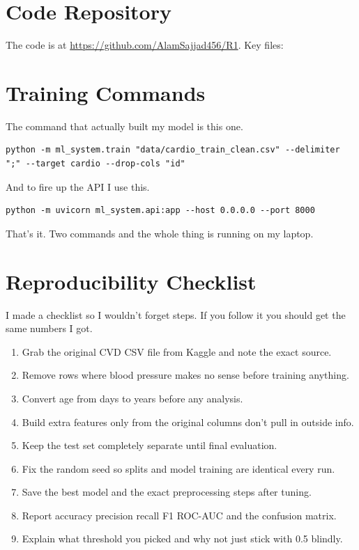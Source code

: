 \documentclass[12pt, a4paper, oneside]{book}
\begin{document}
\section{Code Repository}
The code is at \url{https://github.com/AlamSajjad456/R1}. Key files:



\section{Training Commands}
The command that actually built my model is this one.
\begin{verbatim}
python -m ml_system.train "data/cardio_train_clean.csv" --delimiter ";" --target cardio --drop-cols "id"
\end{verbatim}
And to fire up the API I use this.
\begin{verbatim}
python -m uvicorn ml_system.api:app --host 0.0.0.0 --port 8000
\end{verbatim}
That's it. Two commands and the whole thing is running on my laptop.

\section{Reproducibility Checklist}
I made a checklist so I wouldn't forget steps. If you follow it you should get the same numbers I got.

\begin{enumerate}
  \item Grab the original CVD CSV file from Kaggle and note the exact source.
  \item Remove rows where blood pressure makes no sense before training anything.
  \item Convert age from days to years before any analysis.
  \item Build extra features only from the original columns don't pull in outside info.
  \item Keep the test set completely separate until final evaluation.
  \item Fix the random seed so splits and model training are identical every run.
  \item Save the best model and the exact preprocessing steps after tuning.
  \item Report accuracy precision recall F1 ROC-AUC and the confusion matrix.
  \item Explain what threshold you picked and why not just stick with 0.5 blindly.
\end{enumerate}
\end{document}
